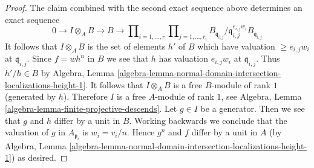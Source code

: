 \begin{proof}
\medskip\noindent
The claim combined with the second exact sequence above
determines an exact sequence
$$
0 \to I \otimes_A B \to B \to
\prod\nolimits_{i = 1, \ldots, r}
\prod\nolimits_{j = 1, \ldots, r_i}
B_{\mathfrak q_{i, j}}/\mathfrak q_{i, j}^{e_{i, j}w_i}B_{\mathfrak q_{i, j}}
$$
It follows that $I \otimes_A B$ is the set of elements $h'$ of $B$
which have valuation $\geq e_{i, j}w_i$ at $\mathfrak q_{i, j}$.
Since $f = wh^n$ in $B$ we see that $h$ has valuation
$e_{i, j}w_i$ at $\mathfrak q_{i, j}$. Thus $h'/h \in B$
by Algebra, Lemma
\ref{algebra-lemma-normal-domain-intersection-localizations-height-1}.
It follows that $I \otimes_A B$ is a free $B$-module of rank $1$
(generated by $h$).
Therefore $I$ is a free $A$-module of rank $1$, see
Algebra, Lemma \ref{algebra-lemma-finite-projective-descends}.
Let $g \in I$ be a generator. Then we see that
$g$ and $h$ differ by a unit in $B$. Working backwards we
conclude that the valuation of $g$ in $A_{\mathfrak p_i}$ is
$w_i = v_i/n$. Hence $g^n$ and $f$ differ by a unit in $A$
(by Algebra, Lemma
\ref{algebra-lemma-normal-domain-intersection-localizations-height-1})
as desired.
\end{proof}